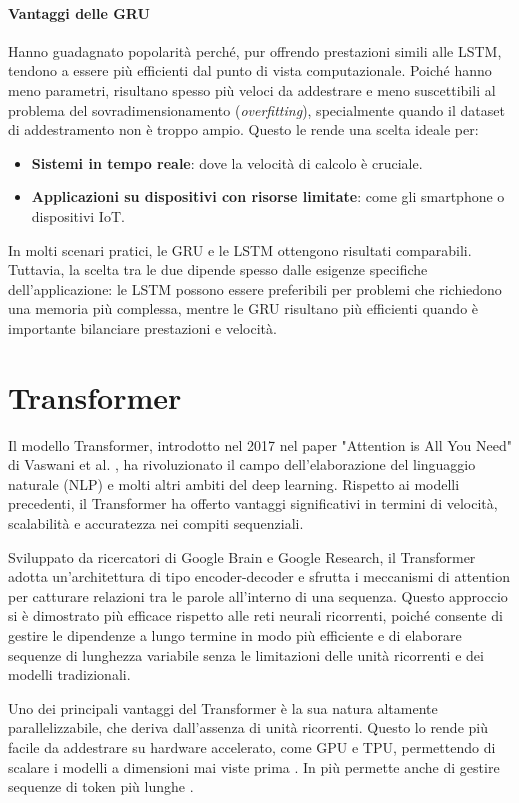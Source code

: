 \paragraph{Vantaggi delle GRU} Hanno guadagnato popolarità perché, pur offrendo prestazioni simili alle LSTM, tendono a essere più efficienti dal punto di vista computazionale. Poiché hanno meno parametri, risultano spesso più veloci da addestrare e meno suscettibili al problema del sovradimensionamento (\textit{overfitting}), specialmente quando il dataset di addestramento non è troppo ampio. Questo le rende una scelta ideale per:
\begin{itemize}
	\item \textbf{Sistemi in tempo reale}: dove la velocità di calcolo è cruciale.
	\item \textbf{Applicazioni su dispositivi con risorse limitate}: come gli smartphone o dispositivi IoT.
\end{itemize}
In molti scenari pratici, le GRU e le LSTM ottengono risultati comparabili. Tuttavia, la scelta tra le due dipende spesso dalle esigenze specifiche dell'applicazione: le LSTM possono essere preferibili per problemi che richiedono una memoria più complessa, mentre le GRU risultano più efficienti quando è importante bilanciare prestazioni e velocità.

\section{Transformer}
Il modello Transformer, introdotto nel 2017 nel paper "Attention is All You Need" di Vaswani et al. \cite{vaswani2023attentionneed}, ha rivoluzionato il campo dell'elaborazione del linguaggio naturale (NLP) e molti altri ambiti del deep learning. Rispetto ai modelli precedenti, il Transformer ha offerto vantaggi significativi in termini di velocità, scalabilità e accuratezza nei compiti sequenziali.

Sviluppato da ricercatori di Google Brain e Google Research, il Transformer adotta un'architettura di tipo encoder-decoder e sfrutta i meccanismi di attention per catturare relazioni tra le parole all'interno di una sequenza. Questo approccio si è dimostrato più efficace rispetto alle reti neurali ricorrenti, poiché consente di gestire le dipendenze a lungo termine in modo più efficiente e di elaborare sequenze di lunghezza variabile senza le limitazioni delle unità ricorrenti e dei modelli tradizionali.

Uno dei principali vantaggi del Transformer è la sua natura altamente parallelizzabile, che deriva dall'assenza di unità ricorrenti. Questo lo rende più facile da addestrare su hardware accelerato, come GPU e TPU, permettendo di scalare i modelli a dimensioni mai viste prima \cite{10.1145/3442188.3445922}. In più permette anche di gestire sequenze di token più lunghe \cite{ding2023longnetscalingtransformers1000000000}.

